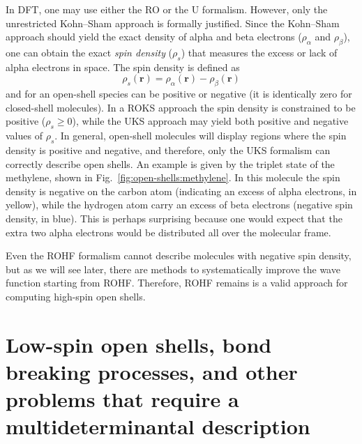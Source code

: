 \documentclass[../Main/notes.tex]{subfiles}
\begin{document}
In DFT, one may use either the RO or the U formalism. However, only the unrestricted Kohn--Sham approach is formally justified.
Since the Kohn--Sham approach should yield the exact density of alpha and beta electrons ($\rho_\alpha$ and $\rho_\beta$), one can obtain the exact \emph{spin density} ($\rho_s$) that measures the excess or lack of alpha electrons in space.
The spin density is defined as
\begin{equation}
\rho_s(\mathbf{r}) = \rho_\alpha(\mathbf{r}) - \rho_\beta(\mathbf{r})
\end{equation}
and for an open-shell species can be positive or negative (it is identically zero for closed-shell molecules).
In a ROKS approach the spin density is constrained to be positive ($\rho_s \geq 0$), while the UKS approach may yield both positive and negative values of $\rho_s$.
In general, open-shell molecules will display regions where the spin density is positive and negative, and therefore, only the UKS formalism can correctly describe open shells.
An example is given by the triplet state of the methylene, shown in Fig.~\ref{fig:open-shells:methylene}. In this molecule the spin density is negative on the carbon atom (indicating an excess of alpha electrons, in yellow), while the hydrogen atom carry an excess of beta electrons (negative spin density, in blue).
This is perhaps surprising because one would expect that the extra two alpha electrons would be distributed all over the molecular frame.

Even the ROHF formalism cannot describe molecules with negative spin density, but as we will see later, there are methods to systematically improve the wave function starting from ROHF.
Therefore, ROHF remains is a valid approach for computing high-spin open shells.

\section{Low-spin open shells, bond breaking processes, and other problems that require a multideterminantal description}
\end{document}
